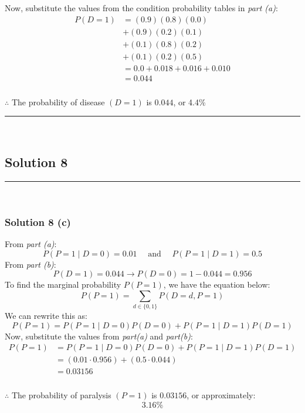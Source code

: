 \documentclass{article}
\begin{document}
Now, substitute the values from the condition probability tables in \textit{part (a)}:
\begin{align*}
    P(D=1) &= (0.9)(0.8)(0.0) \\
    &+ (0.9)(0.2)(0.1) \\
    &+ (0.1)(0.8)(0.2) \\
    &+ (0.1)(0.2)(0.5) \\
    &= 0.0 + 0.018 + 0.016 + 0.010 \\
    &= 0.044
\end{align*}

\subsubsection*{\normalfont}{$\therefore$ The probability of disease $(D=1)$ is $0.044$, or 4.4\%}

\noindent\rule{\textwidth}{0.4pt}\\

\newpage

\subsection*{Solution 8}
\noindent\rule{\textwidth}{0.4pt}\\
\subsubsection*{Solution 8 (c)}
From \textit{part (a)}:
$$P(P=1 \mid D=0) = 0.01 \quad \text{ and } \quad P(P=1 \mid D=1) = 0.5$$
From \textit{part (b)}:
$$P(D=1) = 0.044\rightarrow P(D=0) = 1 - 0.044 = 0.956$$
To find the marginal probability $P(P=1)$, we have the equation below:
$$P(P=1) = \sum_{d \in \{0,1\}} P(D=d, P=1)$$
We can rewrite this as:
$$P(P=1) = P(P=1 \mid D=0)P(D=0) + P(P=1 \mid D=1)P(D=1)$$
Now, substitute the values from \textit{part(a)} and \textit{part(b)}:
\begin{align*}
    P(P=1) &= P(P=1 \mid D=0)P(D=0) + P(P=1 \mid D=1)P(D=1) \\
    &= (0.01 \cdot 0.956) + (0.5 \cdot 0.044) \\
    &= 0.03156
\end{align*}
\subsubsection*{\normalfont}{$\therefore$ The probability of paralysis $(P=1)$ is $0.03156$, or approximately:}
$$3.16\%$$
\end{document}
